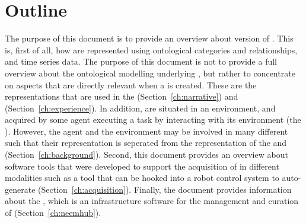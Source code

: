 \section{Outline} %
The purpose of this document is to provide an overview about version \neemversion of \neems.
This is, first of all, how \neems are represented using ontological categories and relationships, and time series data.
The purpose of this document is not to provide a full overview about the ontological modelling underlying \neems, but rather to concentrate on aspects that are directly relevant when a \neem is created.
These are the representations that are used in the \neemnar (Section~\ref{ch:narrative}) and \neemexp (Section~\ref{ch:experience}).
In addition, \neems are situated in an environment, and acquired by some agent executing a task by interacting with its environment (the \neembak).
However, the agent and the environment may be involved in many different \neems such that their representation is seperated from the representation of the \neemnar and \neemexp (Section~\ref{ch:background}).
Second, this document provides an overview about software tools that were developed to support the acquisition of \neems in different modalities such as a tool that can be hooked into a robot control system to auto-generate \neems (Section~\ref{ch:acquisition}).
Finally, the document provides information about the \neemhub, which is an infrastructure software for the management and curation of \neems (Section~\ref{ch:neemhub}).


